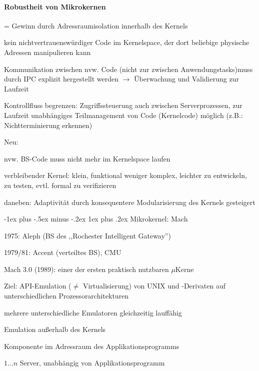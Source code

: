 \documentclass[a4paper]{article}
\makeatletter
\newcommand{\cmark}{\ding{51}}
\renewcommand{\subsubsection}{\@startsection{subsubsection}{3}{0mm}%
 {-1ex plus -.5ex minus -.2ex}%
 {1ex plus .2ex}%
 {\normalfont\small\bfseries}}
\makeatother
\begin{document}
\begin{multicols}{3}
    \paragraph{Robustheit von Mikrokernen}
    \begin{itemize*}
        \item = Gewinn durch Adressraumisolation innerhalb des Kernels
        \item[\cmark] kein nichtvertrauenswürdiger Code im Kernelspace, der dort beliebige physische Adressen manipulieren kann
        \item[\cmark] Kommunikation zwischen nvw. Code (nicht zur zwischen Anwendungstasks)muss durch IPC explizit hergestellt werden $\rightarrow$ Überwachung und Validierung zur Laufzeit
        \item[\cmark] Kontrollfluss begrenzen: Zugriffssteuerung auch zwischen Serverprozessen, zur Laufzeit unabhängiges Teilmanagement von Code (Kernelcode) möglich (z.B.: Nichtterminierung erkennen)
        \item Neu:
        \item[\cmark] nvw. BS-Code muss nicht mehr im Kernelspace laufen
        \item[\cmark] verbleibender Kernel: klein, funktional weniger komplex, leichter zu entwickeln, zu testen, evtl. formal zu verifizieren
        \item[\cmark] daneben: Adaptivität durch konsequentere Modularisierung des Kernels gesteigert
    \end{itemize*}

    \subsubsection{Mikrokernel: Mach}
    \begin{itemize*}
        \item 1975: Aleph (BS des ,,Rochester Intelligent Gateway'')
        \item 1979/81: Accent (verteiltes BS), CMU
        \item Mach 3.0 (1989): einer der ersten praktisch nutzbaren $\mu$Kerne
        \item Ziel: API-Emulation ($\not=$ Virtualisierung) von UNIX und -Derivaten auf unterschiedlichen Prozessorarchitekturen
        \item mehrere unterschiedliche Emulatoren gleichzeitig lauffähig
        \begin{itemize*}
            \item Emulation außerhalb des Kernels
            \item Komponente im Adressraum des Applikationsprogramms
            \item $1...n$ Server, unabhängig von Applikationsprogramm
        \end{itemize*}
    \end{itemize*}


\end{multicols}
\end{document}
